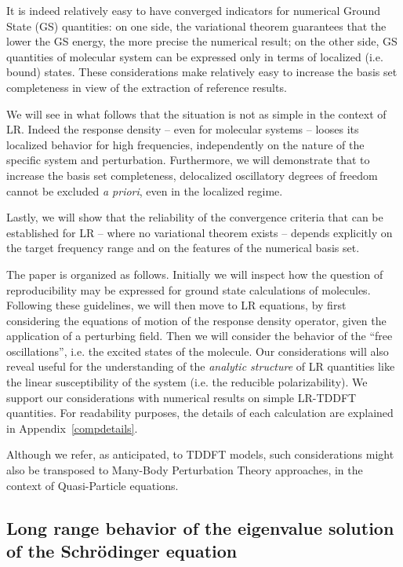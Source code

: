 \documentclass[reprint,aps,prb]{revtex4-1}
\begin{document}
It is indeed relatively easy to have converged indicators for numerical Ground State (GS) quantities: on one side, the variational theorem
guarantees that the lower the GS energy, the more precise the numerical result; on the other side, GS quantities of molecular system  can be expressed only in terms of localized (i.e. bound) states. These considerations make relatively easy to increase the basis set completeness in view of the extraction of reference results.

We will see in what follows that the situation is not as simple in the context of LR. Indeed the response density -- even for molecular systems -- looses its localized behavior for high frequencies, independently on the nature of the specific system and perturbation. Furthermore, we will demonstrate that to increase the basis set completeness, delocalized oscillatory degrees of freedom cannot be excluded \textit{a priori}, even in the localized regime.

Lastly, we will show that the reliability of the convergence criteria that can be established for LR -- where no variational theorem exists -- depends explicitly on the target frequency range and on the features of the numerical basis set.

The paper is organized as follows.
Initially we will inspect how the question of reproducibility may be expressed
for ground state calculations of molecules.
Following these guidelines, we will then move to LR equations,
by first considering the equations of motion of the response density operator, given
the application of a perturbing field.
Then we will consider the behavior of the ``free oscillations'', i.e. the excited states
of the molecule.
Our considerations will also reveal useful for the understanding of the \emph{analytic structure} of LR quantities like
the linear susceptibility of the system (i.e. the reducible polarizability).
We support our considerations with numerical results on simple LR-TDDFT quantities.
For readability purposes, the details of each calculation are explained in Appendix~\ref{compdetails}.

Although we refer, as anticipated, to TDDFT models, such considerations might also be transposed to Many-Body Perturbation Theory
approaches, in the context of Quasi-Particle equations.

\subsection{Long range behavior of the eigenvalue solution of the Schr\"odinger equation}
\label{SEopenSystem}
\end{document}

